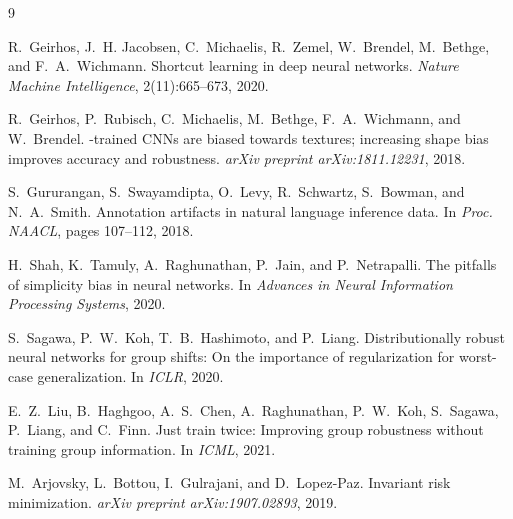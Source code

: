 \documentclass[11pt,a4paper]{article}
\begin{document}

\begin{thebibliography}{9}

R.~Geirhos, J.~H. Jacobsen, C.~Michaelis, R.~Zemel, W.~Brendel, M.~Bethge, and F.~A.~Wichmann.
\newblock Shortcut learning in deep neural networks.
\newblock \emph{Nature Machine Intelligence}, 2(11):665--673, 2020.

R.~Geirhos, P.~Rubisch, C.~Michaelis, M.~Bethge, F.~A.~Wichmann, and W.~Brendel.
-trained {CNN}s are biased towards textures; increasing shape bias improves accuracy and robustness.
\newblock \emph{arXiv preprint arXiv:1811.12231}, 2018.

S.~Gururangan, S.~Swayamdipta, O.~Levy, R.~Schwartz, S.~Bowman, and N.~A.~Smith.
\newblock Annotation artifacts in natural language inference data.
\newblock In \emph{Proc. NAACL}, pages 107--112, 2018.

H.~Shah, K.~Tamuly, A.~Raghunathan, P.~Jain, and P.~Netrapalli.
\newblock The pitfalls of simplicity bias in neural networks.
\newblock In \emph{Advances in Neural Information Processing Systems}, 2020.

S.~Sagawa, P.~W.~Koh, T.~B.~Hashimoto, and P.~Liang.
\newblock Distributionally robust neural networks for group shifts: On the importance of regularization for worst-case generalization.
\newblock In \emph{ICLR}, 2020.

E.~Z.~Liu, B.~Haghgoo, A.~S.~Chen, A.~Raghunathan, P.~W.~Koh, S.~Sagawa, P.~Liang, and C.~Finn.
\newblock Just train twice: Improving group robustness without training group information.
\newblock In \emph{ICML}, 2021.

M.~Arjovsky, L.~Bottou, I.~Gulrajani, and D.~Lopez-Paz.
\newblock Invariant risk minimization.
\newblock \emph{arXiv preprint arXiv:1907.02893}, 2019.

\end{thebibliography}
\end{document}
